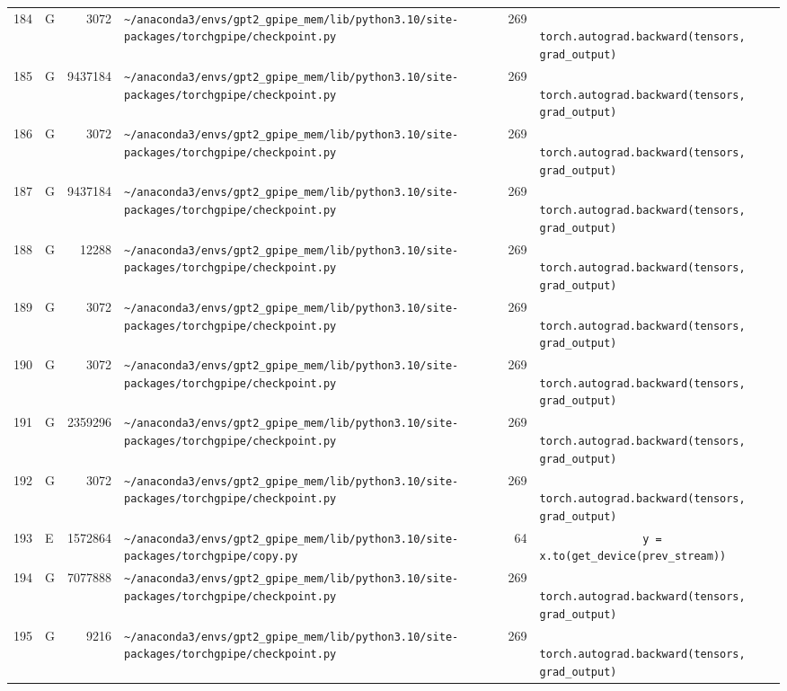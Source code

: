 \documentclass{article}
\begin{document}
\begin{longtable}{r l r p{6.5cm} r p{7.0cm}}
184 & G & 3072 & \lstinline|~/anaconda3/envs/gpt2_gpipe_mem/lib/python3.10/site-packages/torchgpipe/checkpoint.py| & 269 & \lstinline|            torch.autograd.backward(tensors, grad_output)| \\
185 & G & 9437184 & \lstinline|~/anaconda3/envs/gpt2_gpipe_mem/lib/python3.10/site-packages/torchgpipe/checkpoint.py| & 269 & \lstinline|            torch.autograd.backward(tensors, grad_output)| \\
186 & G & 3072 & \lstinline|~/anaconda3/envs/gpt2_gpipe_mem/lib/python3.10/site-packages/torchgpipe/checkpoint.py| & 269 & \lstinline|            torch.autograd.backward(tensors, grad_output)| \\
187 & G & 9437184 & \lstinline|~/anaconda3/envs/gpt2_gpipe_mem/lib/python3.10/site-packages/torchgpipe/checkpoint.py| & 269 & \lstinline|            torch.autograd.backward(tensors, grad_output)| \\
188 & G & 12288 & \lstinline|~/anaconda3/envs/gpt2_gpipe_mem/lib/python3.10/site-packages/torchgpipe/checkpoint.py| & 269 & \lstinline|            torch.autograd.backward(tensors, grad_output)| \\
189 & G & 3072 & \lstinline|~/anaconda3/envs/gpt2_gpipe_mem/lib/python3.10/site-packages/torchgpipe/checkpoint.py| & 269 & \lstinline|            torch.autograd.backward(tensors, grad_output)| \\
190 & G & 3072 & \lstinline|~/anaconda3/envs/gpt2_gpipe_mem/lib/python3.10/site-packages/torchgpipe/checkpoint.py| & 269 & \lstinline|            torch.autograd.backward(tensors, grad_output)| \\
191 & G & 2359296 & \lstinline|~/anaconda3/envs/gpt2_gpipe_mem/lib/python3.10/site-packages/torchgpipe/checkpoint.py| & 269 & \lstinline|            torch.autograd.backward(tensors, grad_output)| \\
192 & G & 3072 & \lstinline|~/anaconda3/envs/gpt2_gpipe_mem/lib/python3.10/site-packages/torchgpipe/checkpoint.py| & 269 & \lstinline|            torch.autograd.backward(tensors, grad_output)| \\
193 & E & 1572864 & \lstinline|~/anaconda3/envs/gpt2_gpipe_mem/lib/python3.10/site-packages/torchgpipe/copy.py| & 64 & \lstinline|                y = x.to(get_device(prev_stream))| \\
194 & G & 7077888 & \lstinline|~/anaconda3/envs/gpt2_gpipe_mem/lib/python3.10/site-packages/torchgpipe/checkpoint.py| & 269 & \lstinline|            torch.autograd.backward(tensors, grad_output)| \\
195 & G & 9216 & \lstinline|~/anaconda3/envs/gpt2_gpipe_mem/lib/python3.10/site-packages/torchgpipe/checkpoint.py| & 269 & \lstinline|            torch.autograd.backward(tensors, grad_output)| \\

\end{longtable}
\end{document}
